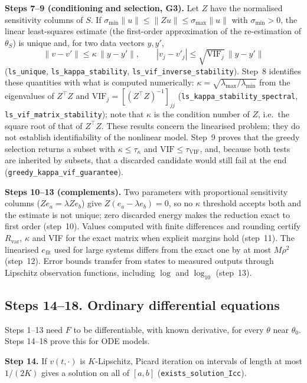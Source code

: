 \textbf{Steps 7--9 (conditioning and selection, G3).} Let $Z$ have the normalised sensitivity columns of $S$. If $\sigma_{\min}\|u\|\le\|Zu\|\le\sigma_{\max}\|u\|$ with $\sigma_{\min}>0$, the linear least-squares estimate (the first-order approximation of the re-estimation of $\theta_S$) is unique and, for two data vectors $y,y'$,
\[
\|v-v'\|\le\kappa\,\|y-y'\|,\qquad |v_j-v'_j|\le\sqrt{\mathrm{VIF}_j}\,\|y-y'\|
\]
(\texttt{ls\_unique}, \texttt{ls\_kappa\_stability}, \texttt{ls\_vif\_inverse\_stability}). Step~8 identifies these quantities with what is computed numerically: $\kappa=\sqrt{\lambda_{\max}/\lambda_{\min}}$ from the eigenvalues of $Z^\top Z$ and $\mathrm{VIF}_j=[(Z^\top Z)^{-1}]_{jj}$ (\texttt{ls\_kappa\_stability\_spectral}, \texttt{ls\_vif\_matrix\_stability}); note that $\kappa$ is the condition number of $Z$, i.e.\ the square root of that of $Z^\top Z$. These results concern the linearised problem; they do not establish identifiability of the nonlinear model. Step~9 proves that the greedy selection returns a subset with $\kappa\le\tau_\kappa$ and $\mathrm{VIF}\le\tau_{\mathrm{VIF}}$, and, because both tests are inherited by subsets, that a discarded candidate would still fail at the end (\texttt{greedy\_kappa\_vif\_guarantee}).

\textbf{Steps 10--13 (complements).} Two parameters with proportional sensitivity columns ($Ze_a=\lambda Ze_b$) give $Z(e_a-\lambda e_b)=0$, so no $\kappa$ threshold accepts both and the estimate is not unique; zero discarded energy makes the reduction exact to first order (step~10). Values computed with finite differences and rounding certify $R_{\mathrm{var}}$, $\kappa$ and VIF for the exact matrix when explicit margins hold (step~11). The linearised $e_{\mathrm{fit}}$ used for large systems differs from the exact one by at most $M\rho^2$ (step~12). Error bounds transfer from states to measured outputs through Lipschitz observation functions, including $\log$ and $\log_{10}$ (step~13).

\subsection*{Steps 14--18. Ordinary differential equations}

Steps 1--13 need $F$ to be differentiable, with known derivative, for every $\theta$ near $\theta_0$. Steps 14--18 prove this for ODE models.

\textbf{Step 14.} If $v(t,\cdot)$ is $K$-Lipschitz, Picard iteration on intervals of length at most $1/(2K)$ gives a solution on all of $[a,b]$ (\texttt{exists\_solution\_Icc}).

